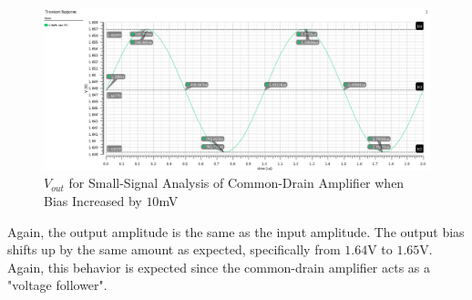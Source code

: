 \FloatBarrier

\FloatBarrier

\begin{figure}[h!]
	\centering
	\includegraphics[scale=0.45]{./images/sim1_vout_plus10mV.PNG}
	\caption{$V_{out}$ for Small-Signal Analysis of Common-Drain Amplifier when Bias Increased by $10$\si{\milli\volt}}
	\label{fig:sim1_vout_plus10mV}
\end{figure}

\FloatBarrier
Again, the output amplitude is the same as the input amplitude.
The output bias shifts up by the same amount as expected, specifically from $1.64$\si{\volt} to $1.65$\si{\volt}.
Again, this behavior is expected since the common-drain amplifier acts as a "voltage follower".
